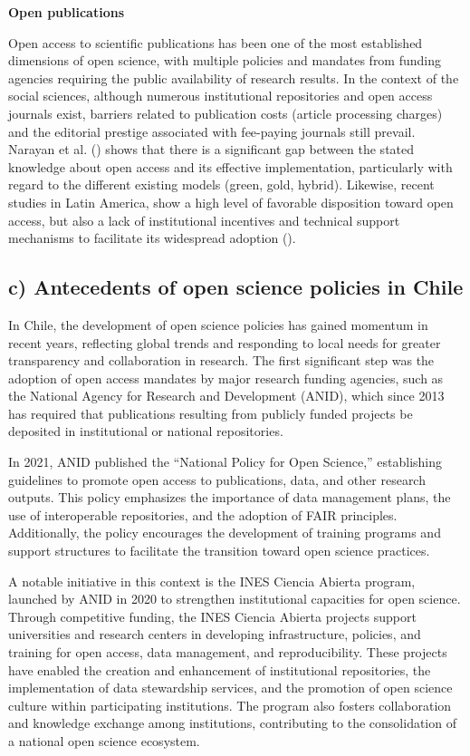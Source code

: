 \documentclass[
  letterpaper,
]{article}
\begin{document}
\textbf{Open publications}

Open access to scientific publications has been one of the most
established dimensions of open science, with multiple policies and
mandates from funding agencies requiring the public availability of
research results. In the context of the social sciences, although
numerous institutional repositories and open access journals exist,
barriers related to publication costs (article processing charges) and
the editorial prestige associated with fee-paying journals still
prevail. Narayan et al. ()
shows that there is a significant gap between the stated knowledge about
open access and its effective implementation, particularly with regard
to the different existing models (green, gold, hybrid). Likewise, recent
studies in Latin America, show a high level of favorable disposition
toward open access, but also a lack of institutional incentives and
technical support mechanisms to facilitate its widespread adoption
().

\subsection{c) Antecedents of open science policies in
Chile}\label{c-antecedents-of-open-science-policies-in-chile}

In Chile, the development of open science policies has gained momentum
in recent years, reflecting global trends and responding to local needs
for greater transparency and collaboration in research. The first
significant step was the adoption of open access mandates by major
research funding agencies, such as the National Agency for Research and
Development (ANID), which since 2013 has required that publications
resulting from publicly funded projects be deposited in institutional or
national repositories.

In 2021, ANID published the ``National Policy for Open Science,''
establishing guidelines to promote open access to publications, data,
and other research outputs. This policy emphasizes the importance of
data management plans, the use of interoperable repositories, and the
adoption of FAIR principles. Additionally, the policy encourages the
development of training programs and support structures to facilitate
the transition toward open science practices.

A notable initiative in this context is the INES Ciencia Abierta
program, launched by ANID in 2020 to strengthen institutional capacities
for open science. Through competitive funding, the INES Ciencia Abierta
projects support universities and research centers in developing
infrastructure, policies, and training for open access, data management,
and reproducibility. These projects have enabled the creation and
enhancement of institutional repositories, the implementation of data
stewardship services, and the promotion of open science culture within
participating institutions. The program also fosters collaboration and
knowledge exchange among institutions, contributing to the consolidation
of a national open science ecosystem.
\end{document}
